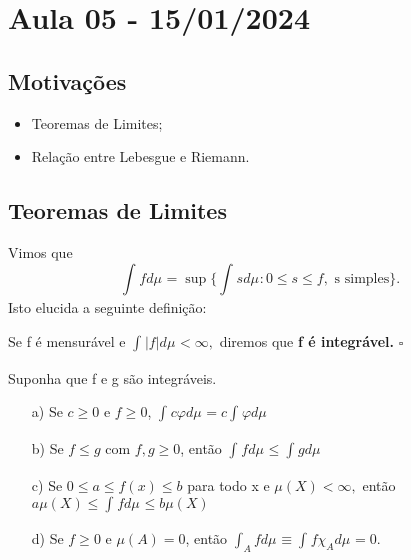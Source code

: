 \documentclass[measure_theory.tex]{subfiles}
\begin{document}
\section{Aula 05 - 15/01/2024}
\subsection{Motivações}
\begin{itemize}
	\item Teoremas de Limites;
	\item Relação entre Lebesgue e Riemann.
\end{itemize}
\subsection{Teoremas de Limites}
Vimos que
\[
	\int_{}f d\mu_{} = \sup_{}\biggl\{\int_{}s d\mu_{}: 0 \leq s\leq f, \text{ s simples}\biggr\}.
\]
Isto elucida a seguinte definição:
\begin{def*}
	Se f é mensurável e \(\int_{}|f| d\mu_{} < \infty,\) diremos que \textbf{f é integrável.} \(\square\)
\end{def*}
\begin{prop*}
	Suponha que f e g são integráveis.
	\begin{itemize}
		\item[a)] Se \(c \geq 0\) e \(f\geq 0\), \(\int_{}c\varphi  d\mu_{} = c \int_{}\varphi d\mu_{}\)
		\item[b)] Se \(f\leq g\) com \(f, g \geq 0\), então \(\int_{}f d\mu_{} \leq \int_{}g d\mu_{}\)
		\item[c)] Se \(0\leq a\leq f(x)\leq b\) para todo x e \(\mu (X) < \infty,\) então \(a\mu (X) \leq \int_{}f d\mu_{} \leq b\mu (X)\)
		\item[d)] Se \(f\geq 0\) e \(\mu (A) = 0\), então \(\int_{A}f d\mu_{}\equiv \int_{}f \chi_{A} d\mu_{} = 0.\)
	\end{itemize}
\end{prop*}
\end{document}
